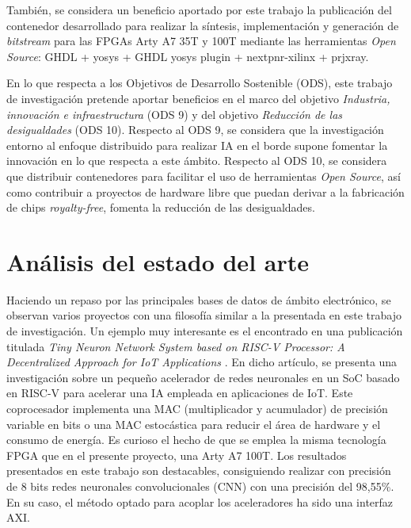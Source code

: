 También, se considera un beneficio aportado por este trabajo la publicación del contenedor \cite{gh:conatiner-implarty} desarrollado para realizar la síntesis, implementación y generación de \textit{bitstream} para las FPGAs Arty A7 35T y 100T mediante las herramientas \textit{Open Source}: GHDL + yosys + GHDL yosys plugin + nextpnr-xilinx + prjxray.

En lo que respecta a los Objetivos de Desarrollo Sostenible (ODS), este trabajo de investigación pretende aportar beneficios en el marco del objetivo \textit{Industria, innovación e infraestructura} (ODS 9) y del objetivo \textit{Reducción de las desigualdades} (ODS 10). 
Respecto al ODS 9, se considera que la investigación entorno al enfoque distribuido para realizar IA en el borde supone fomentar la innovación en lo que respecta a este ámbito.
Respecto al ODS 10, se considera que distribuir contenedores para facilitar el uso de herramientas \textit{Open Source}, así como contribuir a proyectos de hardware libre que puedan derivar a la fabricación de chips \textit{royalty-free}, fomenta la reducción de las desigualdades.

\section{Análisis del estado del arte}

\label{sta-art}

Haciendo un repaso por las principales bases de datos de ámbito electrónico, se observan varios proyectos con una filosofía similar a la presentada en este trabajo de investigación.
Un ejemplo muy interesante es el encontrado en una publicación titulada \textit{Tiny Neuron Network System based on RISC-V Processor: A Decentralized Approach for IoT Applications} \cite{9942990}.
En dicho artículo, se presenta una investigación sobre un pequeño acelerador de redes neuronales en un SoC basado en RISC-V para acelerar una IA empleada en aplicaciones de IoT. 
Este coprocesador implementa una MAC (multiplicador y acumulador) de precisión variable en bits o una MAC estocástica para reducir el área de hardware y el consumo de energía. 
Es curioso el hecho de que se emplea la misma tecnología FPGA que en el presente proyecto, una Arty A7 100T.
Los resultados presentados en este trabajo son destacables, consiguiendo realizar con precisión de 8 bits redes neuronales convolucionales (CNN) con una precisión del 98,55\%.
En su caso, el método optado para acoplar los aceleradores ha sido una interfaz AXI.

